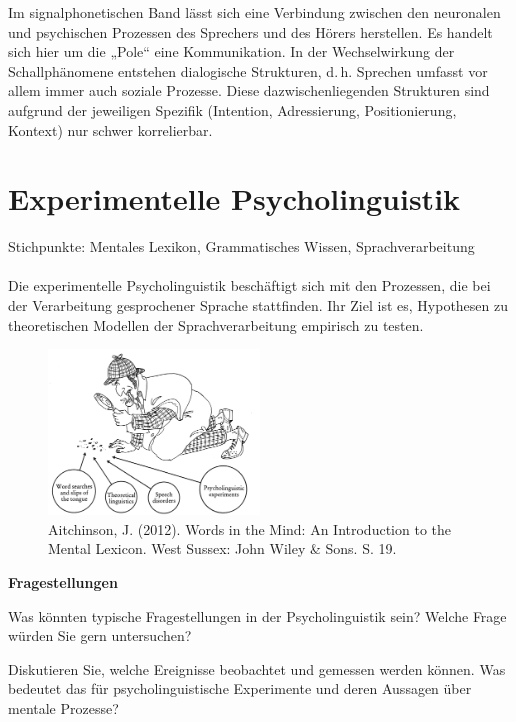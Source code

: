 \documentclass[11pt]{book}
\begin{document}
Im signalphonetischen Band lässt sich eine Verbindung zwischen den neuronalen und psychischen Prozessen des Sprechers und des Hörers herstellen. Es handelt sich hier um die „Pole“ eine Kommunikation. In der Wechselwirkung der Schallphänomene entstehen dialogische Strukturen, d.\,h. Sprechen umfasst vor allem immer auch soziale Prozesse. Diese dazwischenliegenden Strukturen sind aufgrund der jeweiligen Spezifik (Intention, Adressierung, Positionierung, Kontext) nur schwer korrelierbar.


\section{Experimentelle Psycholinguistik}
Stichpunkte: Mentales Lexikon, Grammatisches Wissen, Sprachverarbeitung\\
\\
Die experimentelle Psycholinguistik beschäftigt sich mit den Prozessen, die bei der Verarbeitung gesprochener Sprache stattfinden. Ihr Ziel ist es, Hypothesen zu theoretischen Modellen der Sprachverarbeitung empirisch zu testen.\\
\begin{figure}[htbp]
\begin{center}
\includegraphics[width=0.5\textwidth]{grafiken/psycholinguistik/detektiv}
\caption{Aitchinson, J. (2012). Words in the Mind: An Introduction to the Mental Lexicon. West Sussex: John Wiley \& Sons. S. 19.}
\label{psy1}
\end{center}
\end{figure}
\newpage


\textbf{Fragestellungen}

Was könnten typische Fragestellungen in der Psycholinguistik sein? Welche Frage würden Sie gern untersuchen?

Diskutieren Sie, welche Ereignisse beobachtet und gemessen werden können. Was bedeutet das für psycholinguistische Experimente und deren Aussagen über mentale Prozesse?
\end{document}
